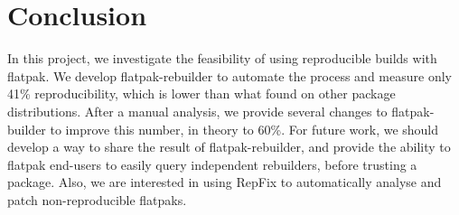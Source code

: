 \documentclass[a4paper,11pt,oneside]{report}
\theoremstyle{definition}
\newcommand{\sysname}{flatpak-rebuilder\xspace}
\newcommand{\rb}{reproducible builds\xspace}
\newcommand{\fp}{flatpak\xspace}
\newcommand{\fb}{flatpak-builder\xspace}
\begin{document}
\chapter{Conclusion}

In this project, we investigate the feasibility of using \rb with \fp. We
develop \sysname to automate the process and measure only 41\% reproducibility,
which is lower than what found on other package distributions. After a manual
analysis, we provide several changes to \fb to improve this number, in theory
to 60\%. For future work, we should develop a way to share the result of
\sysname, and provide the ability to \fp end-users to easily query independent
rebuilders, before trusting a package. Also, we are interested in using RepFix
to automatically analyse and patch non-reproducible flatpaks.

\cleardoublepage
{}
{}
\printbibliography
\end{document}
